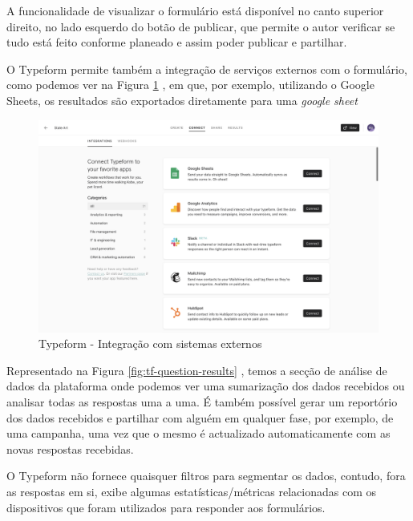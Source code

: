\newpage

A funcionalidade de visualizar o formulário está disponível no canto superior direito, no lado esquerdo do botão de publicar, que permite o autor verificar se tudo está feito conforme planeado e assim poder publicar e partilhar.

O Typeform permite também a integração de serviços externos com o formulário, como podemos ver na Figura \ref{fig:tf-question-integration} , em que, por exemplo, utilizando o Google Sheets\cite{googlesheets}, os resultados são exportados diretamente para uma \textit{google sheet}


\begin{figure}[ht!]
	\begin{center}
		\includegraphics[width=1\textwidth]{img/tf/tf-question-integration}
		\caption{Typeform - Integração com sistemas externos}
		\label{fig:tf-question-integration}
	\end{center}
\end{figure}

Representado na Figura \ref{fig:tf-question-results} , temos a secção de análise de dados da plataforma onde podemos ver uma sumarização dos dados recebidos ou  analisar todas as respostas uma a uma. É também possível gerar um reportório dos dados recebidos e partilhar com alguém em qualquer fase, por exemplo, de uma campanha, uma vez que o mesmo é actualizado automaticamente com as novas respostas recebidas. 

O Typeform não fornece quaisquer filtros para segmentar os dados, contudo, fora as respostas em si, exibe algumas estatísticas/métricas relacionadas com os dispositivos que foram utilizados para responder aos formulários.


